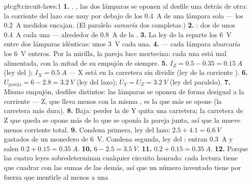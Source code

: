 \begin{solution}{pb:g8:circuit-laws:1}
\textbf{1.} . , las dos lámparas se oponen al
desfile una detrás de otra: la corriente del lazo cae muy por debajo de
los \qty{0.4}{A} de una lámpara sola --- los \qty{0.2}{A} medidos
encajan. (El paralelo \emph{sumaría} dos  completas.)
\textbf{2.} : dos  de unos \qty{0.4}{A} cada una
--- alrededor de \qty{0.8}{A} de la .
\textbf{3.} La ley de la   reparte los \qty{6}{V}
entre dos lámparas idénticas: unos \qty{3}{V} cada una.
\textbf{4.}  --- cada lámpara abarcaría los \qty{6}{V}
enteros. Por la mirilla, la pareja  luce mortecina: cada una
está mal alimentada, con la mitad de su empujón de siempre.
\textbf{5.} $I_Z = 0.5 - 0.35 = \qty{0.15}{A}$ (ley del
); $I_X = \qty{0.5}{A}$ --- X está en la carretera sin
dividir (ley de la corriente ).
\textbf{6.} $U_{\text{pareja}} = 6 - 2.8 = \qty{3.2}{V}$ (ley del
lazo); $U_Y = U_Z = \qty{3.2}{V}$ (ley del paralelo).
\textbf{7.} Mismo empujón, desfiles distintos: las lámparas se oponen
de forma desigual a la corriente --- Z, que lleva menos con la misma
, es la que más se opone (la carretera más dura).
\textbf{8.} Baja: perder la  de Y quita una carretera; la
carretera de Z que queda se opone más de lo que se oponía la pareja
junta, así que la  mueve menos corriente total.
\textbf{9.} Condena primera, ley del lazo: $2.5 + 4.1 = \qty{6.6}{V}$
gastados de un monedero de \qty{6}{V}. Condena segunda, ley del
: entran \qty{0.3}{A} y salen $0.2 + 0.15 =
\qty{0.35}{A}$.
\textbf{10.} $6 - 2.5 = \qty{3.5}{V}$.
\textbf{11.} $0.2 + 0.15 = \qty{0.35}{A}$.
\textbf{12.} Porque las cuatro leyes sobredeterminan cualquier circuito
honrado: cada lectura tiene que cuadrar con las sumas de las demás, así
que un número inventado tiene por fuerza que mentirle al menos a una

\end{solution}
